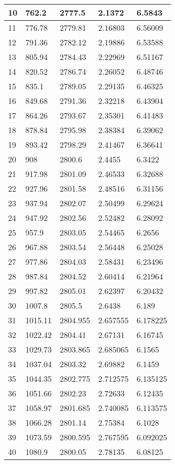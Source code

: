 \documentclass[twocolumn]{article}
\begin{document}
\begin{tabular}{l|l|l|l|l}
10	&	762.2	&	2777.5	&	2.1372	&	6.5843 \\ \hline
11	&	776.78	&	2779.81	&	2.16803	&	6.56009 \\ \hline
12	&	791.36	&	2782.12	&	2.19886	&	6.53588 \\ \hline
13	&	805.94	&	2784.43	&	2.22969	&	6.51167 \\ \hline
14	&	820.52	&	2786.74	&	2.26052	&	6.48746 \\ \hline
15	&	835.1	&	2789.05	&	2.29135	&	6.46325 \\ \hline
16	&	849.68	&	2791.36	&	2.32218	&	6.43904 \\ \hline
17	&	864.26	&	2793.67	&	2.35301	&	6.41483 \\ \hline
18	&	878.84	&	2795.98	&	2.38384	&	6.39062 \\ \hline
19	&	893.42	&	2798.29	&	2.41467	&	6.36641 \\ \hline
20	&	908	&	2800.6	&	2.4455	&	6.3422 \\ \hline
21	&	917.98	&	2801.09	&	2.46533	&	6.32688 \\ \hline
22	&	927.96	&	2801.58	&	2.48516	&	6.31156 \\ \hline
23	&	937.94	&	2802.07	&	2.50499	&	6.29624 \\ \hline
24	&	947.92	&	2802.56	&	2.52482	&	6.28092 \\ \hline
25	&	957.9	&	2803.05	&	2.54465	&	6.2656 \\ \hline
26	&	967.88	&	2803.54	&	2.56448	&	6.25028 \\ \hline
27	&	977.86	&	2804.03	&	2.58431	&	6.23496 \\ \hline
28	&	987.84	&	2804.52	&	2.60414	&	6.21964 \\ \hline
29	&	997.82	&	2805.01	&	2.62397	&	6.20432 \\ \hline
30	&	1007.8	&	2805.5	&	2.6438	&	6.189 \\ \hline
31	&	1015.11	&	2804.955	&	2.657555	&	6.178225 \\ \hline
32	&	1022.42	&	2804.41	&	2.67131	&	6.16745 \\ \hline
33	&	1029.73	&	2803.865	&	2.685065	&	6.1565 \\ \hline
34	&	1037.04	&	2803.32	&	2.69882	&	6.1459 \\ \hline
35	&	1044.35	&	2802.775	&	2.712575	&	6.135125 \\ \hline
36	&	1051.66	&	2802.23	&	2.72633	&	6.12435 \\ \hline
37	&	1058.97	&	2801.685	&	2.740085	&	6.113575 \\ \hline
38	&	1066.28	&	2801.14	&	2.75384	&	6.1028 \\ \hline
39	&	1073.59	&	2800.595	&	2.767595	&	6.092025 \\ \hline
40	&	1080.9	&	2800.05	&	2.78135	&	6.08125 \\ \hline
\end{tabular}
\end{document}
